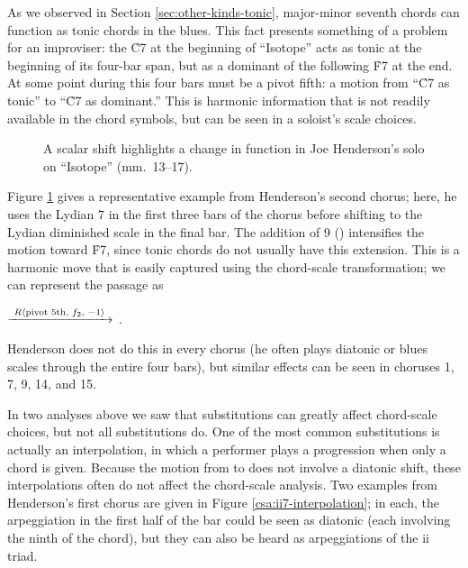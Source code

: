 
As we observed in Section \ref{sec:other-kinds-tonic}, major-minor seventh
chords can function as tonic chords in the blues. This fact presents something
of a problem for an improviser: the \h{C7} at the beginning of ``Isotope''
acts as tonic at the beginning of its four-bar span, but as a dominant of the
following \h{F7} at the end. At some point during this four bars
must be a pivot fifth: a motion from ``\h{C7} as tonic'' to ``\h{C7} as
dominant.'' This is harmonic information that is not readily available in the
chord symbols, but can be seen in a soloist's scale choices.

\begin{figure}[tbp]
  \caption[A scalar shift highlights a change in function in Joe Henderson's
    solo on ``Isotope.'']{A scalar shift highlights a change in function in Joe
    Henderson's solo on ``Isotope'' (mm.~13--17).}
  \label{csa:henderson-scale-shift}
\end{figure}

Figure \ref{csa:henderson-scale-shift} gives a representative example from
Henderson's second chorus; here, he uses the Lydian \flat{}7 in the first
three bars of the chorus before shifting to the Lydian diminished scale in the
final bar. The addition of \flat{}9 (\Dflat) intensifies the motion toward
\h{F7}, since tonic chords do not usually have this extension. This is a
harmonic move that is easily captured using the chord-scale transformation; we
can represent the passage as \\
{\centering
   $\xrightarrow{\text{ \mbox{\ensuremath{R\langle}pivot 5th, $f_2$, $-1$\ensuremath{\rangle}} }}$
  . \par}
\noindent Henderson does not do this in every chorus (he
often plays diatonic or blues scales through the entire four bars), but
similar effects can be seen in choruses 1, 7, 9, 14, and 15.

In two analyses above we saw that substitutions can greatly affect chord-scale
choices, but not all substitutions do. One of the most common substitutions is
actually an interpolation, in which a performer plays a \tf progression when
only a \V chord is given. Because the motion from \ii to \V does not involve a
diatonic shift, these interpolations often do not affect the chord-scale
analysis. Two examples from Henderson's first chorus are given in
Figure \ref{csa:ii7-interpolation}; in each, the arpeggiation in the first
half of the bar could be seen as diatonic (each involving the ninth of the \V
chord), but they can also be heard as arpeggiations of the ii triad.

